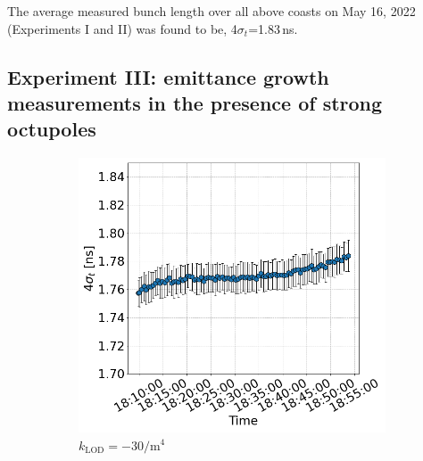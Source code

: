  
 The average measured bunch length over all above coasts on May 16, 2022 (Experiments I and II) was found to be, 4$\sigma_t$=1.83\,ns. 
 
 \newpage
 

 \subsection{Experiment III: emittance growth measurements in the presence of strong octupoles}\label{subsec:2022_exp3_bunch_length}

 \begin{figure}[htp]
    \centering
    \begin{subfigure}{.4\textwidth}
        \centering
        \includegraphics[width=.95\linewidth]{images/app_c/bunch_length_cc_md_sep_coast6.png}  
        \caption{$k_\mathrm{LOD}=-30 \mathrm{/m^{4}}$}
    \end{subfigure}
    \begin{subfigure}{.4\textwidth}
        \centering

\end{subfigure}
\end{figure}
